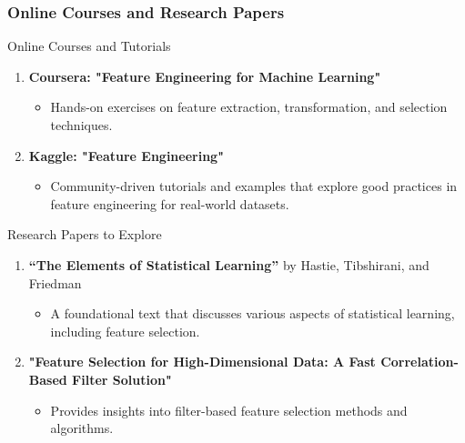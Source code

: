 \documentclass[aspectratio=169]{beamer}
\begin{document}
\begin{frame}[fragile]
    \frametitle{Online Courses and Research Papers}
    \begin{block}{Online Courses and Tutorials}
        \begin{enumerate}
            \item \textbf{Coursera: "Feature Engineering for Machine Learning"}
            \begin{itemize}
                \item Hands-on exercises on feature extraction, transformation, and selection techniques.
            \end{itemize}
            
            \item \textbf{Kaggle: "Feature Engineering"}
            \begin{itemize}
                \item Community-driven tutorials and examples that explore good practices in feature engineering for real-world datasets.
            \end{itemize}
        \end{enumerate}
    \end{block}
    
    \begin{block}{Research Papers to Explore}
        \begin{enumerate}
            \item \textbf{“The Elements of Statistical Learning”} by Hastie, Tibshirani, and Friedman
            \begin{itemize}
                \item A foundational text that discusses various aspects of statistical learning, including feature selection.
            \end{itemize}
            
            \item \textbf{"Feature Selection for High-Dimensional Data: A Fast Correlation-Based Filter Solution"}
            \begin{itemize}
                \item Provides insights into filter-based feature selection methods and algorithms.
            \end{itemize}
        \end{enumerate}
    \end{block}
\end{frame}
\end{document}

